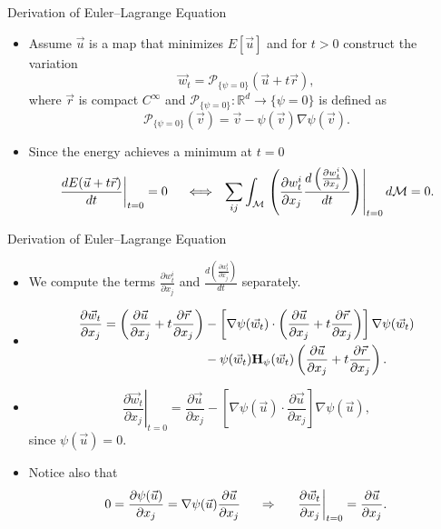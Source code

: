 \documentclass{beamer}
\begin{document}
\begin{frame}{Derivation of Euler--Lagrange Equation}
  \begin{itemize}

\item Assume $\vec{u}$ is a map that minimizes $E[\vec{u}]$ and for $t>0$ construct the variation $$\vec{w}_t = \mathcal{P}_{\lbrace \psi = 0 \rbrace} (\vec{u} +t \vec{r}),$$ where $\vec{r}$ is compact $C^{\infty}$ and $\mathcal{P}_{\lbrace \psi = 0 \rbrace}: \mathbb{R}^d\rightarrow \lbrace \psi = 0 \rbrace$ is defined as $$\mathcal{P}_{\lbrace \psi = 0 \rbrace} (\vec{v}) = \vec{v} - \psi(\vec{v}) \nabla \psi (\vec{v}).$$
\item Since the energy achieves a minimum at $t=0$
\begin{equation*}
\left. \frac{d E(\vec{u} +t \vec{r})}{d t} \right\vert_{t=0} = 0 \hspace{0.5cm}\Longleftrightarrow \hspace{0.25cm}\sum_{ij} \int_{\mathcal{M}} \left. \left( \frac{\partial w^i_t}{\partial x_j} \frac{d\left(\frac{\partial w^i_t}{\partial x_j}\right)}{d t} \right) \right\vert_{t=0} d\mathcal{M} =0.
\end{equation*}
  \end{itemize}
\end{frame}

\begin{frame}{Derivation of Euler--Lagrange Equation}
  \begin{itemize}
  \item We compute the terms $\frac{\partial w^i_t}{\partial x_j}$ and $\frac{d\left(\frac{\partial w^i_t}{\partial x_j}\right)}{d t}$ separately.
\item \begin{align*}
\frac{\partial \vec{w}_t}{\partial x_j} = \left( \frac{\partial \vec{u}}{\partial x_j} + t \frac{\partial \vec{r}}{\partial x_j}\right) &- \left[ \nabla \psi(\vec{w}_t) \cdot \left( \frac{\partial \vec{u}}{\partial x_j} + t \frac{\partial \vec{r}}{\partial x_j}\right) \right] \nabla \psi(\vec{w}_t)\\
& - \psi(\vec{w}_t) {\bf H}_{\psi} (\vec{w}_t) \left( \frac{\partial \vec{u}}{\partial x_j} + t \frac{\partial \vec{r}}{\partial x_j}\right).
\end{align*}
\item \begin{equation*}
\left.\frac{\partial \vec{w}_t}{\partial x_j}\right\vert_{t=0} = \frac{\partial \vec{u}}{\partial x_j} - \left[ \nabla \psi(\vec{u}) \cdot  \frac{\partial \vec{u}}{\partial x_j}  \right] \nabla \psi(\vec{u}),
\end{equation*}
since $\psi (\vec{u}) = 0.$
\item Notice also that $$0= \frac{\partial \psi(\vec{u})}{\partial x_j} = \nabla \psi (\vec{u}) \frac{\partial \vec{u}}{\partial x_j}  \hspace{0.5cm}\Rightarrow \hspace{0.5cm} \left.\frac{\partial \vec{w}_t}{\partial x_j}\right\vert_{t=0}= \frac{\partial \vec{u}}{\partial x_j}.$$
  \end{itemize}
\end{frame}
\end{document}
